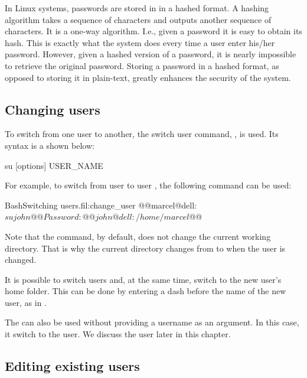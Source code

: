 In Linux systems, passwords are stored  in  in a hashed format. A hashing algorithm takes a sequence of characters and outputs another sequence of characters. It is a one-way algorithm. I.e., given a password it is easy to obtain its hash. This is exactly what the system does every time a user enter his/her password. However, given a hashed version of a password, it is nearly impossible to retrieve the original password. Storing a password in a hashed format, as opposed to storing it in plain-text, greatly enhances the security of the system.

\subsection{Changing users}

To switch from one user to another, the switch user command, , is used. Its syntax is a shown below:
\begin{command_line}
su [options] USER_NAME
\end{command_line}
For example, to switch from user  to user , the following command can be used:
\begin{command_line_float}{Bash}{Switching users.}{fil:change_user}
@@marcel@dell:~$su john@@
Password:
@@john@dell:/home/marcel$@@
\end{command_line_float}

Note that the  command, by default, does not change the current working directory. That is why the current directory changes from  to  when the user is changed. 

It is possible to switch users and, at the same time, switch to the new user's home folder. This can be done by entering a dash before the name of the new user, as in .

The  can also be used without providing a username as an argument. In this case, it switch to the  user. We discuss the  user later in this chapter.


\subsection{Editing existing users}
\label{sec:edit_user}

